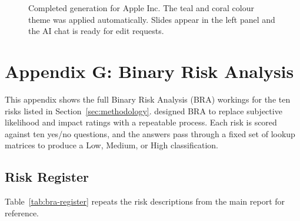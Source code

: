 \begin{figure}[H]
\centering
{}
\caption{Completed generation for Apple Inc. The teal and coral colour theme was applied automatically. Slides appear in the left panel and the AI chat is ready for edit requests.}
\label{fig:addin-output}
\end{figure}

\newpage

\section*{Appendix G: Binary Risk Analysis}
\label{sec:appendix-bra}

This appendix shows the full Binary Risk Analysis (BRA) workings for the ten risks listed in Section~\ref{sec:methodology}. \textcite{sapiro2011} designed BRA to replace subjective likelihood and impact ratings with a repeatable process. Each risk is scored against ten yes/no questions, and the answers pass through a fixed set of lookup matrices to produce a Low, Medium, or High classification.

\subsection*{Risk Register}

Table~\ref{tab:bra-register} repeats the risk descriptions from the main report for reference.

